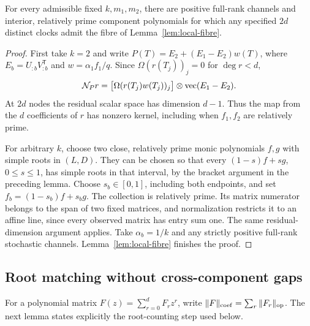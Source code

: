 \begin{proposition}\label{prop:clocks}
For every admissible fixed $k,m_1,m_2$, there are positive full-rank
channels and interior, relatively prime component polynomials for
which any specified $2d$ distinct clocks admit the fibre of
Lemma~\ref{lem:local-fibre}.
\end{proposition}
\begin{proof}
First take $k=2$ and write
$P(T)=E_2+(E_1-E_2)w(T)$, where
$E_b=U_{:b}V_{:b}^{\mathsf T}$ and
$w=\alpha_1f_1/q$. Since $\Omega(r(T_j))_j=0$ for $\deg r<d$,
\[
 \mathcal N_Pr=\big[\Omega(r(T_j)w(T_j))_j\big]
                    \otimes\operatorname{vec}(E_1-E_2).
\]
At $2d$ nodes the residual scalar space has dimension $d-1$.
Thus the map from the $d$ coefficients of $r$ has nonzero kernel,
including when $f_1,f_2$ are relatively prime.

For arbitrary $k$, choose two close, relatively prime monic
polynomials $f,g$ with simple roots in $(L,D)$. They can be chosen so
that every $(1-s)f+sg$, $0\le s\le1$, has simple roots in that
interval, by the bracket argument in the preceding lemma. Choose
$s_b\in[0,1]$, including both endpoints, and set
$f_b=(1-s_b)f+s_bg$. The collection is relatively prime. Its matrix
numerator belongs to the span of two fixed matrices, and normalization
restricts it to an affine line, since every observed matrix has entry
sum one. The same residual-dimension argument applies. Take
$\alpha_b=1/k$ and any strictly positive full-rank stochastic channels.
Lemma~\ref{lem:local-fibre} finishes the proof.
\end{proof}

\subsection{Root matching without cross-component gaps}
For a polynomial matrix $F(z)=\sum_{r=0}^dF_rz^r$, write
$\|F\|_{\mathrm{coef}}=\sum_r\|F_r\|_{\mathrm{op}}$.
The next lemma states explicitly the root-counting step used below.


